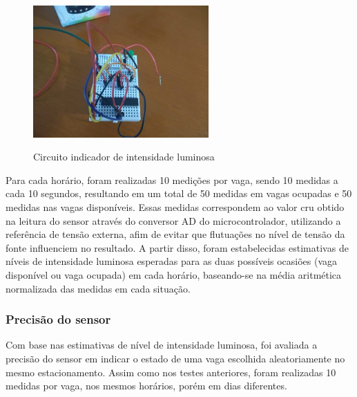 \documentclass[oneside,openright,12pt]{ufsm_2015} %
\begin{document}
    \begin{figure}[H]
     	    \caption{\label{exepretex} Circuito indicador de intensidade luminosa}
            \centering
            \includegraphics[width=0.6\textwidth]{figuras/indicador.jpg}
            \vspace{\baselineskip} %
            \label{fig:led-indicator}
    \end{figure}
    
    Para cada horário, foram realizadas 10 medições por vaga, sendo 10 medidas a cada 10 segundos, resultando em um total de 50 medidas em vagas ocupadas e 50 medidas nas vagas disponíveis. Essas medidas correspondem ao valor cru obtido na leitura do sensor através do conversor AD do microcontrolador, utilizando a referência de tensão externa, afim de evitar que flutuações no nível de tensão da fonte influenciem no resultado. A partir disso, foram estabelecidas estimativas de níveis de intensidade luminosa esperadas para as duas possíveis ocasiões (vaga disponível ou vaga ocupada) em cada horário, baseando-se na média aritmética normalizada das medidas em cada situação. 
    
    \subsubsection{Precisão do sensor}
    Com base nas estimativas de nível de intensidade luminosa, foi avaliada a precisão do sensor em indicar o estado de uma vaga escolhida aleatoriamente no mesmo estacionamento. Assim como nos testes anteriores, foram realizadas 10 medidas por vaga, nos mesmos horários, porém em dias diferentes. 
    
\end{document}
